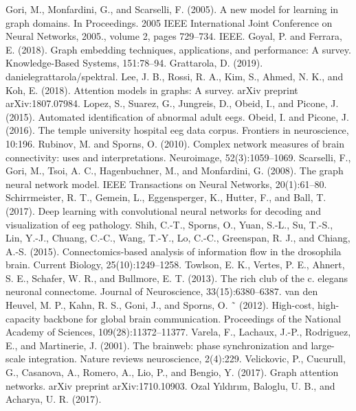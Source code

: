 \documentclass[12pt, a4paper, titlepage]{extreport}
\begin{document}
\begin{thebibliography}{00}
			Gori, M., Monfardini, G., and Scarselli, F. (2005). A new
			model for learning in graph domains. In Proceedings.
			2005 IEEE International Joint Conference on Neural
			Networks, 2005., volume 2, pages 729–734. IEEE.
			Goyal, P. and Ferrara, E. (2018). Graph embedding techniques, applications, and performance: A survey.
			Knowledge-Based Systems, 151:78–94.
			Grattarola, D. (2019). danielegrattarola/spektral.
			Lee, J. B., Rossi, R. A., Kim, S., Ahmed, N. K., and Koh, E.
			(2018). Attention models in graphs: A survey. arXiv
			preprint arXiv:1807.07984.
			Lopez, S., Suarez, G., Jungreis, D., Obeid, I., and Picone,
			J. (2015). Automated identification of abnormal adult
			eegs.
			Obeid, I. and Picone, J. (2016). The temple university
			hospital eeg data corpus. Frontiers in neuroscience,
			10:196.
			Rubinov, M. and Sporns, O. (2010). Complex network measures of brain connectivity: uses and interpretations.
			Neuroimage, 52(3):1059–1069.
			Scarselli, F., Gori, M., Tsoi, A. C., Hagenbuchner, M.,
			and Monfardini, G. (2008). The graph neural network model. IEEE Transactions on Neural Networks,
			20(1):61–80.
			Schirrmeister, R. T., Gemein, L., Eggensperger, K., Hutter,
			F., and Ball, T. (2017). Deep learning with convolutional neural networks for decoding and visualization
			of eeg pathology.
			Shih, C.-T., Sporns, O., Yuan, S.-L., Su, T.-S., Lin, Y.-J.,
			Chuang, C.-C., Wang, T.-Y., Lo, C.-C., Greenspan,
			R. J., and Chiang, A.-S. (2015). Connectomics-based
			analysis of information flow in the drosophila brain.
			Current Biology, 25(10):1249–1258.
			Towlson, E. K., Vertes, P. E., Ahnert, S. E., Schafer, W. R., 
			and Bullmore, E. T. (2013). The rich club of the c. elegans neuronal connectome. Journal of Neuroscience,
			33(15):6380–6387.
			van den Heuvel, M. P., Kahn, R. S., Goni, J., and Sporns, O. ˜
			(2012). High-cost, high-capacity backbone for global
			brain communication. Proceedings of the National
			Academy of Sciences, 109(28):11372–11377.
			Varela, F., Lachaux, J.-P., Rodriguez, E., and Martinerie,
			J. (2001). The brainweb: phase synchronization and
			large-scale integration. Nature reviews neuroscience,
			2(4):229.
			Velickovic, P., Cucurull, G., Casanova, A., Romero, A., Lio,
			P., and Bengio, Y. (2017). Graph attention networks.
			arXiv preprint arXiv:1710.10903.
			Ozal Yıldırım, Baloglu, U. B., and Acharya, U. R. (2017). 

\end{thebibliography}
\end{document}
